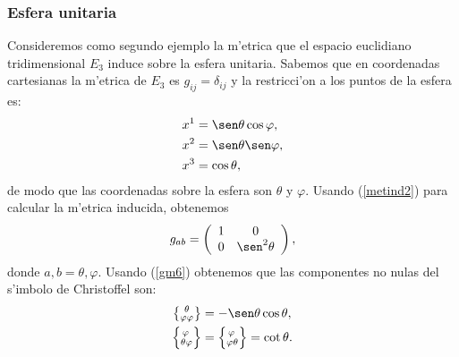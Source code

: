 \subsubsection{Esfera unitaria}

Consideremos como segundo ejemplo la m'etrica que el espacio euclidiano
tridimensional $E_{3}$ induce sobre la esfera unitaria. Sabemos que en
coordenadas cartesianas la m'etrica de $E_{3}$ es $g_{ij}=\delta_{ij}$ y la restricci'on a los puntos de la esfera es:
\begin{align}
x^1  &  =\sen\theta\cos\varphi,\\
x^2  &  =\sen\theta\sen\varphi,\\
x^{3}  &  =\cos\theta,
\end{align}
de modo que las coordenadas sobre la esfera son $\theta$ y $\varphi$. Usando
(\ref{metind2}) para calcular la m'etrica inducida, obtenemos
\begin{equation}
g_{ab}=\left(
\begin{array}[c]{cc}
1 & 0\\
0 & \sen^2\theta
\end{array}\right) ,  \label{ind7}
\end{equation}
donde $a,b=\theta,\varphi$. Usando (\ref{gm6}) obtenemos que las componentes no
nulas del s'imbolo de Christoffel son:
\begin{align}
\left\{  _{\varphi\varphi}^{\ \theta}\right\}  &  =-\sen\theta\cos\theta,\label{ind8}\\
\left\{  _{\theta\varphi}^{\, \varphi}\right\}   &  =\left\{  _{\varphi\theta}^{\,\varphi}\right\}  =\cot\theta.
\end{align}

